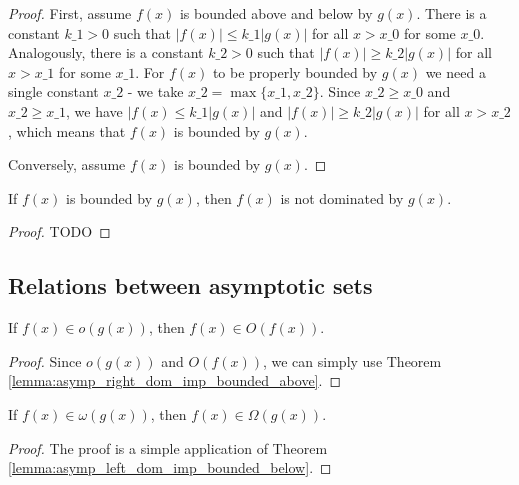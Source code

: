 \begin{proof}
    \leanok
    First, assume $f(x)$ is bounded above and below by $g(x)$. There is a constant
    $k\_1 > 0$ such that $|f(x)| \le k\_1 |g(x)|$ for all $x > x\_0$ for some $x\_0$.
    Analogously, there is a constant $k\_2 > 0$ such that $|f(x)| \ge k\_2 |g(x)|$ 
    for all $x > x\_1$ for some $x\_1$. For $f(x)$ to be properly bounded by $g(x)$ 
    we need a single constant $x\_2$ - we take $x\_2 = \max{\{x\_1, x\_2\}}$. Since 
    $x\_2 \ge x\_0$ and $x\_2 \ge x\_1$, we have $|f(x) \le k\_1 |g(x)|$ and 
    $|f(x)| \ge k\_2 |g(x)|$ for all $x > x\_2$, which means that $f(x)$ is bounded
    by $g(x)$.

    Conversely, assume $f(x)$ is bounded by $g(x)$.
\end{proof}

\begin{lemma}
    \label{thm:asymp_bounded_imp_not_right_dom}
    \leanok
    If $f(x)$ is bounded by $g(x)$, then $f(x)$ is not dominated by $g(x)$.
\end{lemma}

\begin{proof}
    TODO 
\end{proof}


\subsection{Relations between asymptotic sets}

\begin{lemma}
    \label{lemma:small_o_imp_big_o}
    \leanok
    If $f(x) \in o(g(x))$, then $f(x) \in O(f(x))$.
\end{lemma}

\begin{proof}
    \leanok
    Since $o(g(x))$ and $O(f(x))$, we can simply use Theorem 
    \ref{lemma:asymp_right_dom_imp_bounded_above}.
\end{proof}

\begin{theorem}
    \label{thm:small_omega_imp_big_omega}
    \leanok
    If $f(x) \in \omega(g(x))$, then $f(x) \in \Omega(g(x))$.
\end{theorem}

\begin{proof}
    \leanok
    The proof is a simple application of Theorem 
    \ref{lemma:asymp_left_dom_imp_bounded_below}.
\end{proof}

